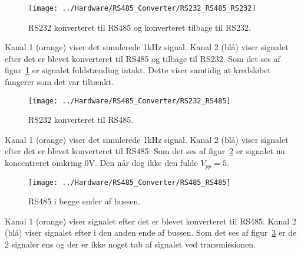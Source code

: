 \begin{figure}[H]
	\centering
	\texttt{[image: ../Hardware/RS485\_Converter/RS232\_RS485\_RS232]}
	\caption{RS232 konverteret til RS485 og konverteret tilbage til RS232.}
	\label{photo:RS232_RS485_RS232}
\end{figure}

Kanal 1 (orange) viser det simulerede 1kHz signal. Kanal 2 (blå) viser signalet efter det er blevet konverteret til RS485 og tilbage til RS232. Som det ses af figur~\ref{photo:RS232_RS485_RS232} er signalet fuldstænding intakt. Dette viser samtidig at kredsløbet fungerer som det var tiltænkt.

\begin{figure}[H]
	\centering
	\texttt{[image: ../Hardware/RS485\_Converter/RS232\_RS485]}
	\caption{RS232 konverteret til RS485.}
	\label{photo:RS232_RS485}
\end{figure}

Kanal 1 (orange) viser det simulerede 1kHz signal. Kanal 2 (blå) viser signalet efter det er blevet konverteret til RS485. Som det ses af figur~\ref{photo:RS232_RS485} er signalet nu koncentreret omkring 0V. Den når dog ikke den fulde $V_{pp} = 5$. 

\begin{figure}[H]
	\centering
	\texttt{[image: ../Hardware/RS485\_Converter/RS485\_RS485]}
	\caption{RS485 i begge ender af bussen.}
	\label{photo:RS485_RS485}
\end{figure}

Kanal 1 (orange) viser signalet efter det er blevet konverteret til RS485. Kanal 2 (blå) viser signalet efter i den anden ende af bussen. Som det ses af figur~\ref{photo:RS485_RS485} er de 2 signaler ens og der er ikke noget tab af signalet ved transmissionen.